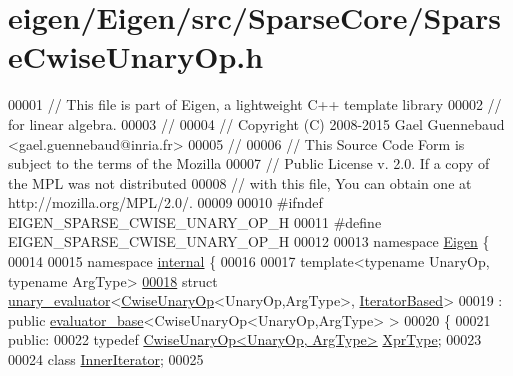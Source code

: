 \hypertarget{eigen_2_eigen_2src_2_sparse_core_2_sparse_cwise_unary_op_8h_source}{}\section{eigen/\+Eigen/src/\+Sparse\+Core/\+Sparse\+Cwise\+Unary\+Op.h}
\label{eigen_2_eigen_2src_2_sparse_core_2_sparse_cwise_unary_op_8h_source}

\begin{DoxyCode}
00001 \textcolor{comment}{// This file is part of Eigen, a lightweight C++ template library}
00002 \textcolor{comment}{// for linear algebra.}
00003 \textcolor{comment}{//}
00004 \textcolor{comment}{// Copyright (C) 2008-2015 Gael Guennebaud <gael.guennebaud@inria.fr>}
00005 \textcolor{comment}{//}
00006 \textcolor{comment}{// This Source Code Form is subject to the terms of the Mozilla}
00007 \textcolor{comment}{// Public License v. 2.0. If a copy of the MPL was not distributed}
00008 \textcolor{comment}{// with this file, You can obtain one at http://mozilla.org/MPL/2.0/.}
00009 
00010 \textcolor{preprocessor}{#ifndef EIGEN\_SPARSE\_CWISE\_UNARY\_OP\_H}
00011 \textcolor{preprocessor}{#define EIGEN\_SPARSE\_CWISE\_UNARY\_OP\_H}
00012 
00013 \textcolor{keyword}{namespace }\hyperlink{namespace_eigen}{Eigen} \{ 
00014 
00015 \textcolor{keyword}{namespace }\hyperlink{namespaceinternal}{internal} \{
00016   
00017 \textcolor{keyword}{template}<\textcolor{keyword}{typename} UnaryOp, \textcolor{keyword}{typename} ArgType>
\hyperlink{struct_eigen_1_1internal_1_1unary__evaluator_3_01_cwise_unary_op_3_01_unary_op_00_01_arg_type_01_4_00_01_iterator_based_01_4}{00018} \textcolor{keyword}{struct }\hyperlink{struct_eigen_1_1internal_1_1unary__evaluator}{unary\_evaluator}<\hyperlink{group___core___module_class_eigen_1_1_cwise_unary_op}{CwiseUnaryOp}<UnaryOp,ArgType>, 
      \hyperlink{struct_eigen_1_1internal_1_1_iterator_based}{IteratorBased}>
00019   : \textcolor{keyword}{public} \hyperlink{struct_eigen_1_1internal_1_1evaluator__base}{evaluator\_base}<CwiseUnaryOp<UnaryOp,ArgType> >
00020 \{
00021   \textcolor{keyword}{public}:
00022     \textcolor{keyword}{typedef} \hyperlink{group___core___module_class_eigen_1_1_cwise_unary_op}{CwiseUnaryOp<UnaryOp, ArgType>} \hyperlink{group___core___module_class_eigen_1_1_cwise_unary_op}{XprType};
00023 
00024     \textcolor{keyword}{class }\hyperlink{class_eigen_1_1_inner_iterator}{InnerIterator};
00025     

\end{DoxyCode}
